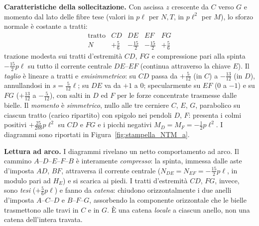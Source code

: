 \begin{esercizio}
\begin{svolgimento}
	\medskip\noindent\textbf{Caratteristiche della sollecitazione.}
	Con ascissa $z$ crescente da $C$ verso $G$ e momento dal lato delle fibre
	tese (valori in $p\ell$ per $N,T$, in $p\ell^2$ per $M$), lo sforzo normale
	è costante a tratti:
	\[
	\begin{array}{l|cccc}
		\text{tratto} & CD & DE & EF & FG\\\hline
		N & +\tfrac{5}{6} & -\tfrac{15}{2} & -\tfrac{15}{2} & +\tfrac{5}{6}
	\end{array}
	\]
	trazione modesta sui tratti d'estremità $CD$, $FG$ e compressione pari alla
	spinta $-\tfrac{15}{2}p\ell$ su tutto il corrente centrale $DE$--$EF$
	(continua attraverso la chiave $E$). Il \emph{taglio} è lineare a tratti e
	\emph{emisimmetrico}: su $CD$ passa da $+\tfrac{5}{12}$ (in $C$) a
	$-\tfrac{13}{12}$ (in $D$), annullandosi in $s=\tfrac{5}{12}\ell$; su $DE$
	va da $+1$ a $0$; specularmente su $EF$ ($0$ a $-1$) e su $FG$
	($+\tfrac{13}{12}$ a $-\tfrac{5}{12}$), con salti in $D$ ed $F$ per le forze
	concentrate trasmesse dalle bielle. Il \emph{momento} è \emph{simmetrico},
	nullo alle tre cerniere $C$, $E$, $G$, parabolico su ciascun tratto (carico
	ripartito) con spigolo nei pendoli $D$, $F$: presenta i colmi positivi
	$+\tfrac{25}{288}p\ell^2$ su $CD$ e $FG$ e i picchi negativi
	$M_D=M_F=-\tfrac12 p\ell^2$. I diagrammi sono riportati in
	Figura~\ref{fig:stampella_NTM_a}.
	
	



	
	
	
%


	
	\medskip\noindent\textbf{Lettura ad arco.}
	I diagrammi rivelano un netto comportamento ad arco. Il cammino
	$A$--$D$--$E$--$F$--$B$ è interamente \emph{compresso}: la spinta, immessa
	dalle aste d'imposta $AD$, $BF$, attraversa il corrente centrale
	($N_{DE}=N_{EF}=-\tfrac{15}{2}p\ell$, in modulo pari ad $H_E$) e si scarica
	ai piedi. I tratti d'estremità $CD$, $FG$, invece, sono \emph{tesi}
	($+\tfrac56 p\ell$) e fanno da \emph{catena}: chiudono orizzontalmente i due
	anelli d'imposta $A$--$C$--$D$ e $B$--$F$--$G$, assorbendo la componente
	orizzontale che le bielle trasmettono alle travi in $C$ e in $G$. È una
	catena \emph{locale} a ciascun anello, non una catena dell'intera travata.
	
	
	

\end{svolgimento}
\end{esercizio}
